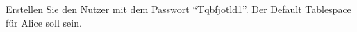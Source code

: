     \item Erstellen Sie den Nutzer  mit dem Passwort \enquote{Tqbfjotld1}. Der Default Tablespace für Alice soll  sein.
